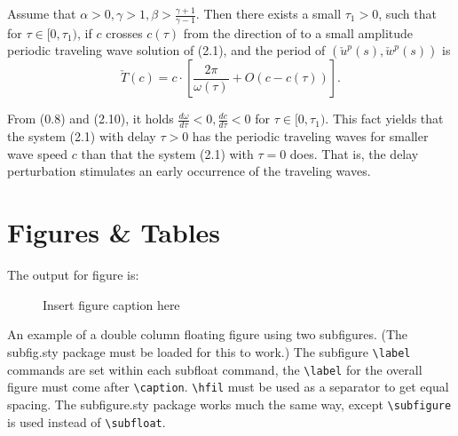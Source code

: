 \documentclass{article}
\begin{document}
\begin{theorem}\label{T0.1}
Assume that $\alpha>0, \gamma>1, \beta>\frac{\gamma+1}{\gamma-1}$.
Then there exists a small $\tau_1>0$, such that for $\tau\in
[0,\tau_1)$, if $c$ crosses $c(\tau)$ from the direction of
to  a small amplitude periodic traveling wave solution of
(2.1), and the period of $(\check{u}^p(s),\check{w}^p(s))$ is
\[
\check{T}(c)=c\cdot \left[\frac{2\pi}{\omega(\tau)}+O(c-c(\tau))\right].
\]
\end{theorem}


\begin{conjecture}\label{C2.2}
From (0.8) and (2.10), it holds
$\frac{d\omega}{d\tau}<0,\frac{dc}{d\tau}<0$ for $\tau\in
[0,\tau_1)$. This fact yields that the system (2.1) with delay
$\tau>0$ has the periodic traveling waves for smaller wave speed $c$
than that the system (2.1) with $\tau=0$ does. That is, the
delay perturbation stimulates an early occurrence of the traveling waves.
\end{conjecture}


\section{Figures \& Tables}

The output for figure is:

\begin{figure}[!h]
\caption{Insert figure caption here}
\label{fig_sim}
\end{figure}

 An example of a double column floating figure using two subfigures.
 (The subfig.sty package must be loaded for this to work.)
 The subfigure \verb+\label+ commands are set within each subfloat command, the
 \verb+\label+ for the overall figure must come after \verb+\caption+.
 \verb+\hfil+ must be used as a separator to get equal spacing.
 The subfigure.sty package works much the same way, except \verb+\subfigure+ is
 used instead of \verb+\subfloat+.


\vskip2pc
\end{document}
